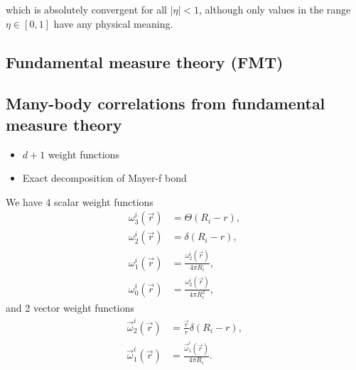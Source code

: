 \documentclass[12pt]{report}
\begin{document}
which is absolutely convergent for all $|\eta| < 1$, although only values in the range $\eta \in [0,1]$ have any physical meaning.

\subsection{Fundamental measure theory (FMT)}

\subsection{Many-body correlations from fundamental measure theory}

\begin{itemize}
\item $d+1$ weight functions
\item Exact decomposition of Mayer-f bond
\end{itemize}

We have 4 scalar weight functions
\begin{subequations}
  \begin{align}
    \omega_3^i(\vec{r}) &= \Theta(R_i - r), \\
    \omega_2^i(\vec{r}) &= \delta(R_i - r), \\
    \omega_1^i(\vec{r}) &= \frac{\omega_2^i(\vec{r})}{4\pi R_i}, \\
    \omega_0^i(\vec{r}) &= \frac{\omega_2^i(\vec{r})}{4\pi R_i^2},
  \end{align}
\end{subequations}
and 2 vector weight functions
\begin{subequations}
  \begin{align}
    \vec{\omega}_2^i(\vec{r}) &=
    \frac{\vec{r}}{r} \delta(R_i - r), \\
    \vec{\omega}_1^i(\vec{r}) &=
    \frac{\vec{\omega}_1^i(\vec{r})}{4\pi R_i}.
  \end{align}
\end{subequations}
\end{document}
